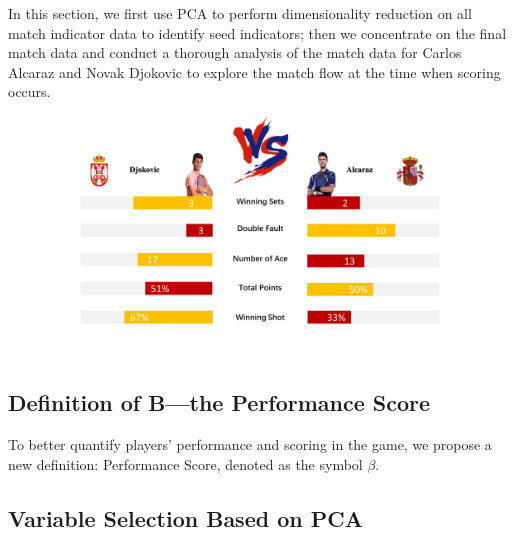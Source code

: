 \documentclass[12pt]{article}%
\begin{document}
In this section, we first use PCA to perform dimensionality reduction on all match indicator data to identify seed indicators; then we concentrate on the final match data and conduct a thorough analysis of the match data for Carlos Alcaraz and Novak Djokovic to explore the match flow at the time when scoring occurs.
\begin{figure}[H]
	\centering
	\includegraphics[scale=0.54]{figure//pk.jpg}
	\label{pk}
\end{figure}

	
	
	\subsection{Definition of B—the Performance Score}
	
	To better quantify players' performance and scoring in the game, we propose a new definition: Performance Score, denoted as the symbol $\beta$. 
	
	\subsection{Variable Selection Based on PCA}
	
\end{document}
